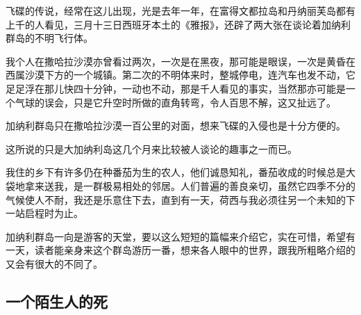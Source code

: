 \par 飞碟的传说，经常在这儿出现，光是去年一年，在富得文都拉岛和丹纳丽芙岛都有上千的人看见，三月十三日西班牙本土的《雅报》，还辟了两大张在谈论着加纳利群岛的不明飞行体。
\par 我个人在撒哈拉沙漠亦曾看过两次，一次是在黑夜，那可能是眼误，一次是黄昏在西属沙漠下方的一个城镇。第二次的不明体来时，整城停电，连汽车也发不动，它足足浮在那儿快四十分钟，一动也不动，那是千人看见的事实，当然那亦可能是一个气球的误会，只是它升空时所做的直角转弯，令人百思不解，这又扯远了。
\par 加纳利群岛只在撒哈拉沙漠一百公里的对面，想来飞碟的入侵也是十分方便的。
\par 这所说的只是大加纳利岛这几个月来比较被人谈论的趣事之一而已。
\par 我住的乡下有许多仍在种番茄为生的农人，他们诚恳知礼，番茄收成的时候总是大袋地拿来送我，是一群极易相处的邻居。人们普遍的善良亲切，虽然它四季不分的气候使人不耐，我还是乐意住下去，直到有一天，荷西与我必须往另一个未知的下一站启程时为止。
\par 加纳利群岛一向是游客的天堂，要以这么短短的篇幅来介绍它，实在可惜，希望有一天，读者能亲身来这个群岛游历一番，想来各人眼中的世界，跟我所粗略介绍的又会有很大的不同了。



\subsection{一个陌生人的死}

